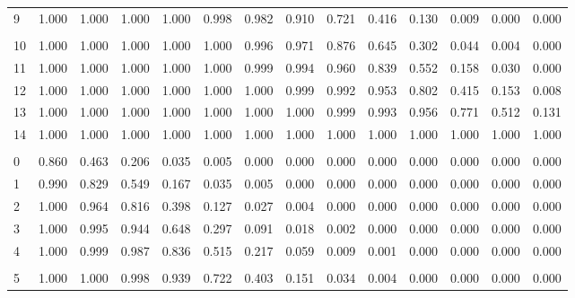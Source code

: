 \documentclass[
]{article}
\begin{document}
\begin{longtable}[t]{lrrrrrrrrrrrrr}
\hspace{1em}9 & 1.000 & 1.000 & 1.000 & 1.000 & 0.998 & 0.982 & 0.910 & 0.721 & 0.416 & 0.130 & 0.009 & 0.000 & 0.000\\
\addlinespace[-.7em]
\multicolumn{14}{l}{ }\\
\hspace{1em}10 & 1.000 & 1.000 & 1.000 & 1.000 & 1.000 & 0.996 & 0.971 & 0.876 & 0.645 & 0.302 & 0.044 & 0.004 & 0.000\\
\hspace{1em}11 & 1.000 & 1.000 & 1.000 & 1.000 & 1.000 & 0.999 & 0.994 & 0.960 & 0.839 & 0.552 & 0.158 & 0.030 & 0.000\\
\hspace{1em}12 & 1.000 & 1.000 & 1.000 & 1.000 & 1.000 & 1.000 & 0.999 & 0.992 & 0.953 & 0.802 & 0.415 & 0.153 & 0.008\\
\hspace{1em}13 & 1.000 & 1.000 & 1.000 & 1.000 & 1.000 & 1.000 & 1.000 & 0.999 & 0.993 & 0.956 & 0.771 & 0.512 & 0.131\\
\hspace{1em}14 & 1.000 & 1.000 & 1.000 & 1.000 & 1.000 & 1.000 & 1.000 & 1.000 & 1.000 & 1.000 & 1.000 & 1.000 & 1.000\\
\addlinespace[0.3em]
\multicolumn{14}{l}{$n=15$}\\
\hspace{1em}0 & 0.860 & 0.463 & 0.206 & 0.035 & 0.005 & 0.000 & 0.000 & 0.000 & 0.000 & 0.000 & 0.000 & 0.000 & 0.000\\
\hspace{1em}1 & 0.990 & 0.829 & 0.549 & 0.167 & 0.035 & 0.005 & 0.000 & 0.000 & 0.000 & 0.000 & 0.000 & 0.000 & 0.000\\
\hspace{1em}2 & 1.000 & 0.964 & 0.816 & 0.398 & 0.127 & 0.027 & 0.004 & 0.000 & 0.000 & 0.000 & 0.000 & 0.000 & 0.000\\
\hspace{1em}3 & 1.000 & 0.995 & 0.944 & 0.648 & 0.297 & 0.091 & 0.018 & 0.002 & 0.000 & 0.000 & 0.000 & 0.000 & 0.000\\
\hspace{1em}4 & 1.000 & 0.999 & 0.987 & 0.836 & 0.515 & 0.217 & 0.059 & 0.009 & 0.001 & 0.000 & 0.000 & 0.000 & 0.000\\
\addlinespace[-.7em]
\multicolumn{14}{l}{ }\\
\hspace{1em}5 & 1.000 & 1.000 & 0.998 & 0.939 & 0.722 & 0.403 & 0.151 & 0.034 & 0.004 & 0.000 & 0.000 & 0.000 & 0.000\\

\end{longtable}
\end{document}
